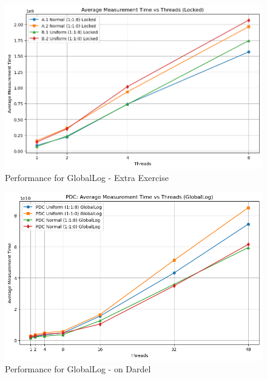 \documentclass{article}
\begin{document}
\begin{figure}[H]
    \centering
    \includegraphics[width=\textwidth]{LaTex/images/Lab 3 2.5.2.2.png}
    \caption{Performance for GlobalLog - Extra Exercise}
    \label{fig:global-log-1-1-8}
\end{figure}

\begin{figure}[H]
    \centering
    \includegraphics[width=\textwidth]{LaTex/images/Lab 3 2.5.2.3.png}
    \caption{Performance for GlobalLog - on Dardel}
    \label{fig:global-log-1-1-8}
\end{figure}
\end{document}
